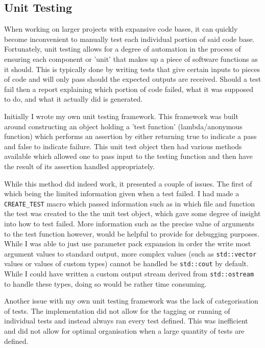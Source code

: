 \subsection{Unit Testing}
	When working on larger projects with expansive code bases, it can quickly become inconvenient to manually test each individual portion of said code base. Fortunately, unit testing allows for a degree of automation in the process of ensuring each component or 'unit' that makes up a piece of software functions as it should. This is typically done by writing tests that give certain inputs to pieces of code and will only pass should the expected outputs are received. Should a test fail then a report explaining which portion of code failed, what it was supposed to do, and what it actually did is generated.

	Initially I wrote my own unit testing framework. This framework was built around constructing an object holding a 'test function' (lambda/anonymous function) which performs an assertion by either returning true to indicate a pass and false to indicate failure. This unit test object then had various methods available which allowed one to pass input to the testing function and then have the result of its assertion handled appropriately.

	While this method did indeed work, it presented a couple of issues. The first of which being the limited information given when a test failed. I had made a \texttt{CREATE\_TEST} macro which passed information such as in which file and function the test was created to the the unit test object, which gave some degree of insight into how to test failed. More information such as the precise value of arguments to the test function however, would be helpful to provide for debugging purposes. While I was able to just use parameter pack expansion in order the write most argument values to standard output, more complex values (such as \texttt{std::vector} values or values of custom types) cannot be handled be \texttt{std::cout} by default. While I could have written a custom output stream derived from \texttt{std::ostream} to handle these types, doing so would be rather time consuming.

	Another issue with my own unit testing framework was the lack of categorisation of tests. The implementation did not allow for the tagging or running of individual tests and instead always ran every test defined. This was inefficient and did not allow for optimal organisation when a large quantity of tests are defined.

